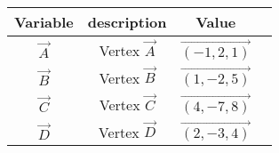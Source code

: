     \begin{tabular}{|c|c|c|c|}
        \hline
        Variable & description     & Value                  \\
        \hline
        $\vec{A}$  & Vertex $\vec{A}$    & $\vec{(-1, 2, 1)}$                   \\
        $\vec{B}$  & Vertex $\vec{B}$     & $\vec{(1, -2, 5)}$                   \\
        $\vec{C}$  & Vertex $\vec{C}$     & $\vec{(4, -7, 8)}$               \\
        $\vec{D}$  & Vertex $\vec{D}$  & $\vec{(2, -3, 4)}$                   \\
        \hline
    \end{tabular}